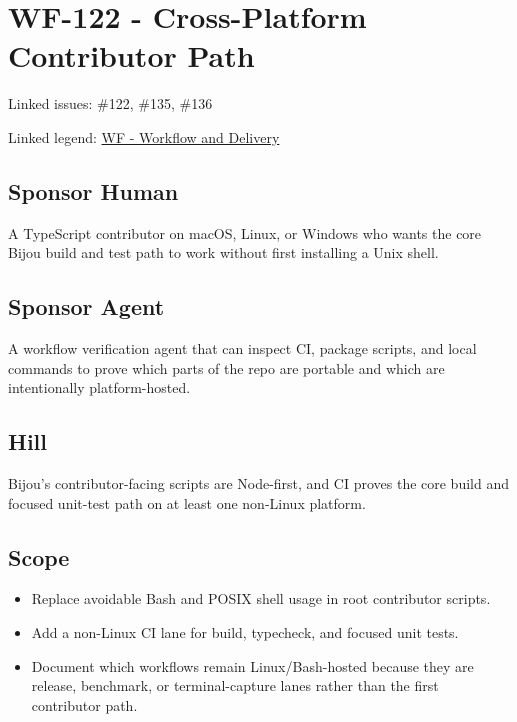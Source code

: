\chapter{WF-122 - Cross-Platform Contributor Path}\label{record-206}

\smallskip

Linked issues: \#122, \#135, \#136

Linked legend: \href{https://github.com/flyingrobots/bijou/blob/1853ad902f6bf219326409e7f743a5a1d6517dbc/docs/legends/WF-workflow-and-delivery.md}{WF - Workflow and Delivery}

\section{Sponsor Human}\label{record-206-sponsor-human}

A TypeScript contributor on macOS, Linux, or Windows who wants the core Bijou build and test path to work without first installing a Unix shell.

\section{Sponsor Agent}\label{record-206-sponsor-agent}

A workflow verification agent that can inspect CI, package scripts, and local commands to prove which parts of the repo are portable and which are intentionally platform-hosted.

\section{Hill}\label{record-206-hill}

Bijou's contributor-facing scripts are Node-first, and CI proves the core build and focused unit-test path on at least one non-Linux platform.

\section{Scope}\label{record-206-scope}

\begin{itemize}
\tightlist
\item
  Replace avoidable Bash and POSIX shell usage in root contributor scripts.
\item
  Add a non-Linux CI lane for build, typecheck, and focused unit tests.
\item
  Document which workflows remain Linux/Bash-hosted because they are release, benchmark, or terminal-capture lanes rather than the first contributor path.
\end{itemize}

